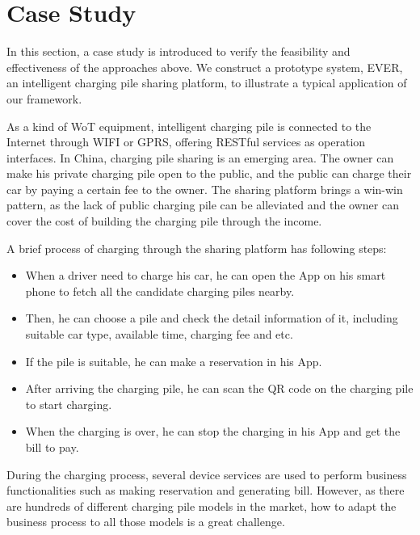 \section{Case Study}
\label{CaseStudy}
In this section, a case study is introduced to verify the feasibility and effectiveness of the approaches above. We construct a prototype system, EVER, an intelligent charging pile sharing platform, to illustrate a typical application of our framework. 

As a kind of WoT equipment, intelligent charging pile is connected to the Internet through WIFI or GPRS, offering RESTful services as operation interfaces. In China, charging pile sharing is an emerging area. The owner can make his private charging pile open to the public, and the public can charge their car by paying a certain fee to the owner. The sharing platform brings a win-win pattern, as the lack of public charging pile can be alleviated and the owner can cover the cost of building the charging pile through the income. 

A brief process of charging through the sharing platform has following steps:
\begin{itemize}
\setlength{\itemsep}{1pt}
\setlength{\parskip}{0pt}
\setlength{\parsep}{0pt}
\item When a driver need to charge his car, he can open the App on his smart phone to fetch all the candidate charging piles nearby. 
\item Then, he can choose a pile and check the detail information of it, including suitable car type, available time, charging fee and etc. 
\item If the pile is suitable, he can make a reservation in his App. 
\item After arriving the charging pile, he can scan the QR code on the charging pile to start charging. 
\item When the charging is over, he can stop the charging in his App and get the bill to pay. 
\end{itemize}

During the charging process, several device services are used to perform business functionalities such as making reservation and generating bill. However, as there are hundreds of different charging pile models in the market, how to adapt the business process to all those models is a great challenge. 

